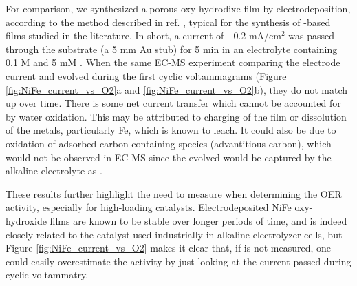 For comparison, we synthesized a porous  oxy-hydrodixe film by electrodeposition, according to the method described in ref. , typical for the synthesis of -based films studied in the literature\cite{Dionigi2016b}. In short, a current of - ​0.2 mA/cm$^2$ was passed through the substrate (a 5 mm Au stub) for 5 min in an electrolyte containing 0.1 M  and 5 mM . When the same EC-MS experiment comparing the electrode current and evolved  during the first cyclic voltammagrams (Figure \ref{fig:NiFe_current_vs_O2}a and \ref{fig:NiFe_current_vs_O2}b), they do not match up over time. There is some net current transfer which cannot be accounted for by water oxidation. This may be attributed to charging of the film or dissolution of the metals, particularly Fe, which is known to leach. It could also be due to oxidation of adsorbed carbon-containing species (advantitious carbon), which would not be observed in EC-MS since the evolved  would be captured by the alkaline electrolyte as .

These results further highlight the need to measure  when determining the OER activity, especially for high-loading catalysts. Electrodeposited NiFe oxy-hydroxide films are known to be stable over longer periods of time, and is indeed closely related to the catalyst used industrially in alkaline electrolyzer cells, but Figure \ref{fig:NiFe_current_vs_O2} makes it clear that, if  is not measured, one could easily overestimate the activity by just looking at the current passed during cyclic voltammatry.